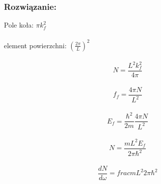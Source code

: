 \subsubsection*{Rozwiązanie:}
Pole koła: $\pi k_f^2$
\\
\\
element powierzchni: $(\frac{2\pi}{L})^2$
\\
\\
\begin{equation}
N=\frac{L^2k_f^2}{4\pi}
\end{equation}
\\
\begin{equation}
f_f=\frac{4\pi N}{L^2} 
\end{equation}
\\
\begin{equation}
E_f=\frac{\hbar^2}{2m}\frac{4\pi N}{L^2}
\end{equation}
\\
\begin{equation}
N=\frac{mL^2E_f}{2\pi \hbar^2}
\end{equation}
\\
\begin{equation}
\frac{dN}{d\omega}=frac{mL^2}{2\pi \hbar^2}
\end{equation}

